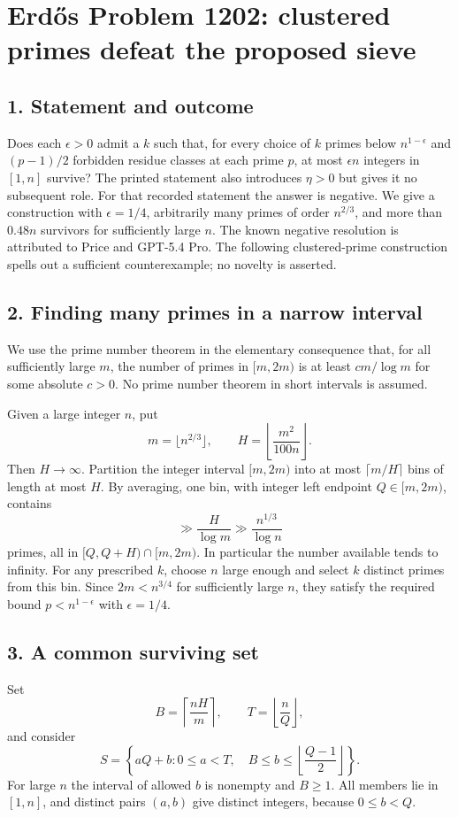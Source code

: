 \section*{Erd\H{o}s Problem 1202: clustered primes defeat the proposed sieve}
\subsection*{1. Statement and outcome}
Does each $\epsilon>0$ admit a $k$ such that, for every choice of $k$ primes below $n^{1-\epsilon}$ and $(p-1)/2$ forbidden residue classes at each prime $p$, at most $\epsilon n$ integers in $[1,n]$ survive? The printed statement also introduces $\eta>0$ but gives it no subsequent role. For that recorded statement the answer is negative. We give a construction with $\epsilon=1/4$, arbitrarily many primes of order $n^{2/3}$, and more than $0.48n$ survivors for sufficiently large $n$.
The known negative resolution is attributed to Price and GPT-5.4 Pro. The following clustered-prime construction spells out a sufficient counterexample; no novelty is asserted.

\subsection*{2. Finding many primes in a narrow interval}
We use the prime number theorem in the elementary consequence that, for all sufficiently large $m$, the number of primes in $[m,2m)$ is at least $c m/\log m$ for some absolute $c>0$. No prime number theorem in short intervals is assumed.

Given a large integer $n$, put
\[
 m=\lfloor n^{2/3}\rfloor,\qquad H=\left\lfloor\frac{m^2}{100n}\right\rfloor.
\]
Then $H\to\infty$. Partition the integer interval $[m,2m)$ into at most $\lceil m/H\rceil$ bins of length at most $H$. By averaging, one bin, with integer left endpoint $Q\in[m,2m)$, contains
\[
 \gg\frac{H}{\log m}\gg\frac{n^{1/3}}{\log n}
\]
primes, all in $[Q,Q+H)\cap[m,2m)$. In particular the number available tends to infinity. For any prescribed $k$, choose $n$ large enough and select $k$ distinct primes from this bin. Since $2m<n^{3/4}$ for sufficiently large $n$, they satisfy the required bound $p<n^{1-\epsilon}$ with $\epsilon=1/4$.

\subsection*{3. A common surviving set}
Set
\[
 B=\left\lceil\frac{nH}{m}\right\rceil,\qquad
 T=\left\lfloor\frac nQ\right\rfloor,
\]
and consider
\[
 S=\left\{aQ+b:0\le a<T,\quad B\le b\le
 \left\lfloor\frac{Q-1}{2}\right\rfloor\right\}. \tag{1}
\]
For large $n$ the interval of allowed $b$ is nonempty and $B\ge1$. All members lie in $[1,n]$, and distinct pairs $(a,b)$ give distinct integers, because $0\le b<Q$.

